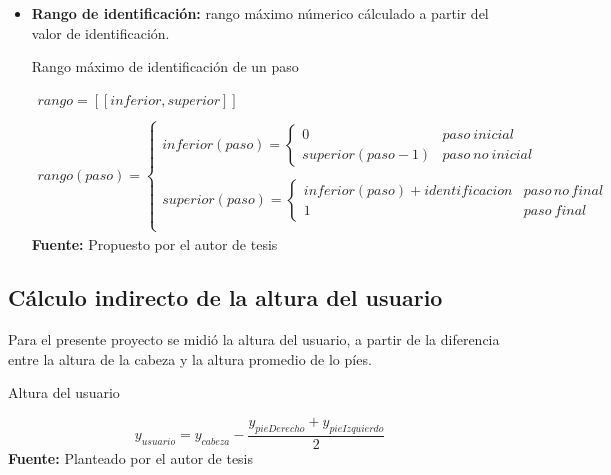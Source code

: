 \begin{itemize}
\item \textbf{Rango de identificaci\'on:} rango m\'aximo n\'umerico c\'alculado a partir del valor de identificaci\'on.
\begin{formula}[H]
	\centering
	\caption{Rango m\'aximo de identificaci\'on de un paso}
	\label{frm:idenStep}
	\begin{equation}
\begin{matrix}
rango = [[inferior,superior]] \\
\\
rango(paso)=\left\{\begin{matrix}
inferior(paso)= \left\{\begin{matrix}
0 & paso\: inicial\\ 
superior(paso-1) & paso\: no\: inicial
\end{matrix}\right.\\ 
\\
superior(paso)= \left\{\begin{matrix}
inferior(paso)+identificacion & paso\, no\, final\\ 
1 & paso\: final

\end{matrix}\right.\\ 
\end{matrix}\right.
\end{matrix}
	\end{equation}
	\textbf{Fuente:} Propuesto por el autor de tesis
\end{formula} 
\end{itemize}
\subsection{C\'alculo indirecto de la altura del usuario} \label{dis:height}
Para el presente proyecto se midi\'o la altura del usuario, a partir de la diferencia entre la altura de la cabeza y la altura promedio de lo p\'ies.
	\begin{formula}[H]
	\centering
	\caption{Altura del usuario}
	\label{frm:alturaUser}
	\begin{equation}
y_{usuario}=y_{cabeza}-\frac{y_{pieDerecho}+y_{pieIzquierdo}}{2}
	\end{equation}
			\textbf{Fuente:} Planteado por el autor de tesis
\end{formula} 
